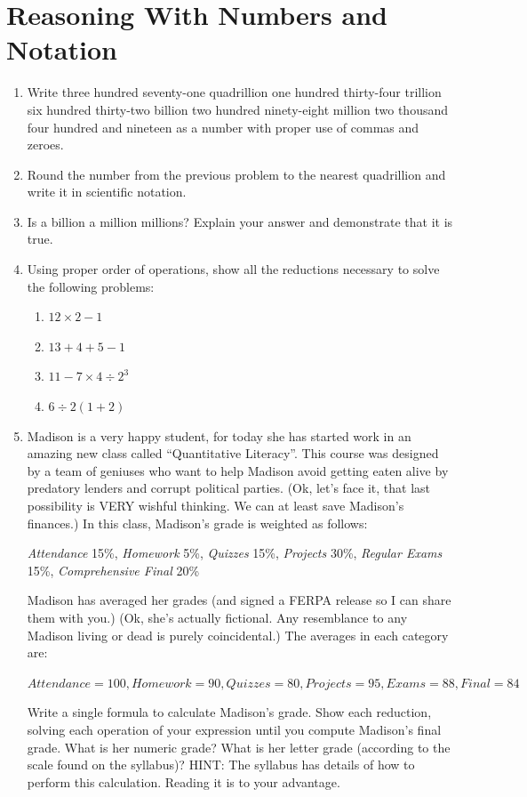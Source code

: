 \documentclass{article}
\begin{document}
\section*{Reasoning With Numbers and Notation}
\begin{enumerate}[resume]
    \item Write three hundred seventy-one quadrillion one
        hundred thirty-four trillion six hundred
        thirty-two billion two hundred ninety-eight million two thousand four hundred
        and nineteen as a number with proper use of commas and zeroes.
    \item Round the number from the previous problem to the nearest quadrillion and write it in scientific notation.
    \item Is a billion a million millions?  Explain your answer and demonstrate that it
      is true.
    \item Using proper order of operations, show all the reductions necessary to solve the following problems:
    \begin{enumerate}
        \item $12 \times 2 - 1$
        \item $13+4+5-1$
        \item $11-7\times 4 \div 2^3$
        \item $6 \div 2(1+2)$
    \end{enumerate}
\item Madison is a very happy student, for today she has started work in an amazing new
class called ``Quantitative Literacy''.  This course was designed by a team of geniuses
who want to help Madison avoid getting eaten alive by predatory lenders and corrupt political
parties. (Ok, let's face it, that last possibility is VERY wishful thinking.  We can at least save Madison's finances.) In this class, Madison's grade is weighted as follows:

    {\em Attendance} 15\%,  {\em Homework} 5\%, {\em Quizzes} 15\%,
    {\em Projects} 30\%, {\em Regular Exams} 15\%, {\em Comprehensive Final} 20\%

Madison has averaged her grades (and signed a FERPA release so I can share them with you.)  (Ok, she's actually fictional.  Any resemblance to any Madison living or dead is purely
coincidental.)  The averages in each category are:

    $Attendance=100, Homework=90, Quizzes=80, Projects=95, Exams=88, Final=84$
    
Write a single formula to calculate Madison's grade.  Show each reduction,
solving each operation of your expression until you compute Madison's final grade.
What is her numeric grade? What is her letter grade (according to the scale found on the syllabus)?  HINT: The syllabus has details of how to perform this calculation.  Reading
it is to your advantage.

\end{enumerate}
\end{document}
